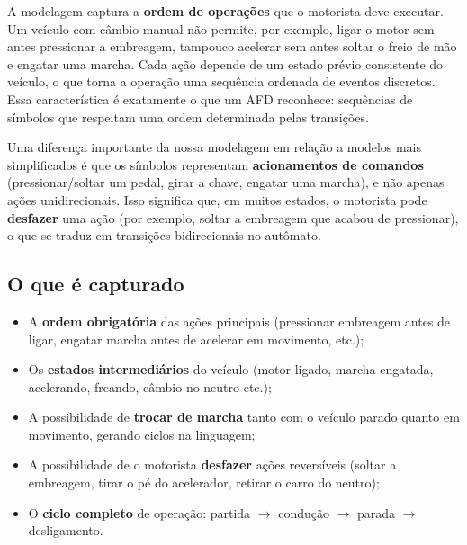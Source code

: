 \documentclass[12pt,a4paper]{article}
\begin{document}
A modelagem captura a \textbf{ordem de operações} que o motorista deve executar. Um veículo com câmbio manual não permite, por exemplo, ligar o motor sem antes pressionar a embreagem, tampouco acelerar sem antes soltar o freio de mão e engatar uma marcha. Cada ação depende de um estado prévio consistente do veículo, o que torna a operação uma sequência ordenada de eventos discretos. Essa característica é exatamente o que um AFD reconhece: sequências de símbolos que respeitam uma ordem determinada pelas transições.

Uma diferença importante da nossa modelagem em relação a modelos mais simplificados é que os símbolos representam \textbf{acionamentos de comandos} (pressionar/soltar um pedal, girar a chave, engatar uma marcha), e não apenas ações unidirecionais. Isso significa que, em muitos estados, o motorista pode \textbf{desfazer} uma ação (por exemplo, soltar a embreagem que acabou de pressionar), o que se traduz em transições bidirecionais no autômato.

\subsection{O que é capturado}
\begin{itemize}
    \item A \textbf{ordem obrigatória} das ações principais (pressionar embreagem antes de ligar, engatar marcha antes de acelerar em movimento, etc.);
    \item Os \textbf{estados intermediários} do veículo (motor ligado, marcha engatada, acelerando, freando, câmbio no neutro etc.);
    \item A possibilidade de \textbf{trocar de marcha} tanto com o veículo parado quanto em movimento, gerando ciclos na linguagem;
    \item A possibilidade de o motorista \textbf{desfazer} ações reversíveis (soltar a embreagem, tirar o pé do acelerador, retirar o carro do neutro);
    \item O \textbf{ciclo completo} de operação: partida $\rightarrow$ condução $\rightarrow$ parada $\rightarrow$ desligamento.
\end{itemize}
\end{document}
